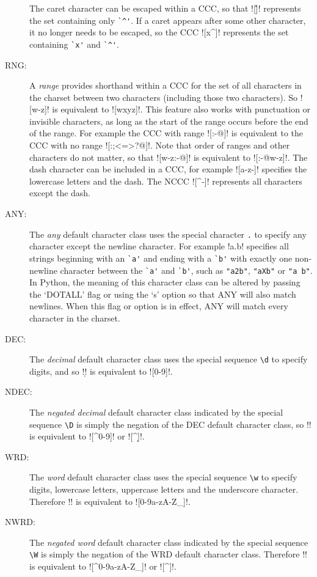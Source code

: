 \begin{description}
The caret character can be escaped within a CCC, so that \cverb![\^]! represents the set containing only \verb!`^'!.  If a caret appears after some other character, it no longer needs to be escaped, so the CCC \cverb![x^]! represents the set containing \verb!`x'! and \verb!`^'!.
\item[RNG:] A \emph{range} provides shorthand within a CCC for the set of all characters in the charset between two characters (including those two characters).  So \cverb![w-z]! is equivalent to \cverb![wxyz]!.  This feature also works with punctuation or invisible characters, as long as the start of the range occurs before the end of the range.  For example the CCC with range \cverb![:-@]! is equivalent to the CCC with no range \cverb![:;<=>?@]!.  Note that order of ranges and other characters do not matter, so that \cverb![w-z:-@]! is equivalent to \cverb![:-@w-z]!.  The dash character can be included in a CCC, for example \cverb![a-z-]! specifies the lowercase letters and the dash.  The NCCC \cverb![^-]! represents all characters except the dash.
\item[ANY:] The \emph{any} default character class uses the special character \verb!.! to specify any character except the newline character.  For example \cverb!a.b! specifies all strings beginning with an \verb!`a'! and ending with a \verb!`b'! with exactly one non-newline character between the \verb!`a'! and \verb!`b'!, such as \verb!"a2b"!, \verb!"aXb"! or \verb!"a b"!.  In Python, the meaning of this character class can be altered by passing the `DOTALL' flag or using the `s' option so that ANY will also match newlines.  When this flag or option is in effect, ANY will match every character in the charset.
\item[DEC:] The \emph{decimal} default character class uses the special sequence \verb!\d! to specify digits, and so \cverb!\d! is equivalent to \cverb![0-9]!.
\item[NDEC:] The \emph{negated decimal} default character class indicated by the special sequence \verb!\D! is simply the negation of the DEC default character class, so \cverb!\D! is equivalent to \cverb![^0-9]! or \cverb![^\d]!.
\item[WRD:] The \emph{word} default character class uses the special sequence \verb!\w! to specify digits, lowercase letters, uppercase letters and the underscore character.  Therefore \cverb!\w! is equivalent to \cverb![0-9a-zA-Z_]!.
\item[NWRD:] The \emph{negated word} default character class indicated by the special sequence \verb!\W! is simply the negation of the WRD default character class.  Therefore \cverb!\W! is equivalent to \cverb![^0-9a-zA-Z_]! or \cverb![^\w]!.

\end{description}
